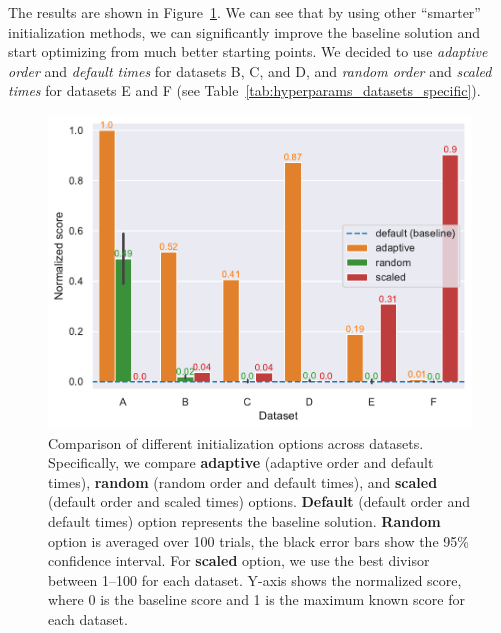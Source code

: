 The results are shown in Figure~\ref{fig:init_comparison}. We can see that by using other ``smarter'' initialization methods, we can significantly improve the baseline solution and start optimizing from much better starting points.
We decided to use \textit{adaptive order} and \textit{default times} for datasets B, C, and D, and \textit{random order} and \textit{scaled times} for datasets E and F (see Table~\ref{tab:hyperparams_datasets_specific}).

\begin{figure}[h]
    \centering
    \includegraphics[width=\linewidth]{img/experiments/init_experiment.pdf}
    \caption[Comparison of initialization options]{
        Comparison of different initialization options across datasets.
        Specifically, we compare \textcolor{myorange}{\textbf{adaptive}} (adaptive order and default times), \textcolor{mygreen}{\textbf{random}} (random order and default times), and \textcolor{myred}{\textbf{scaled}} (default order and scaled times) options. \textcolor{myblue}{\textbf{Default}} (default order and default times) option represents the baseline solution.
        \textcolor{mygreen}{\textbf{Random}} option is averaged over 100 trials, the black error bars show the 95\% confidence interval.
        For \textcolor{myred}{\textbf{scaled}} option, we use the best divisor between 1--100 for each dataset.
        Y-axis shows the normalized score, where 0 is the baseline score and 1 is the maximum known score for each dataset.
    }
    \label{fig:init_comparison}
\end{figure}

